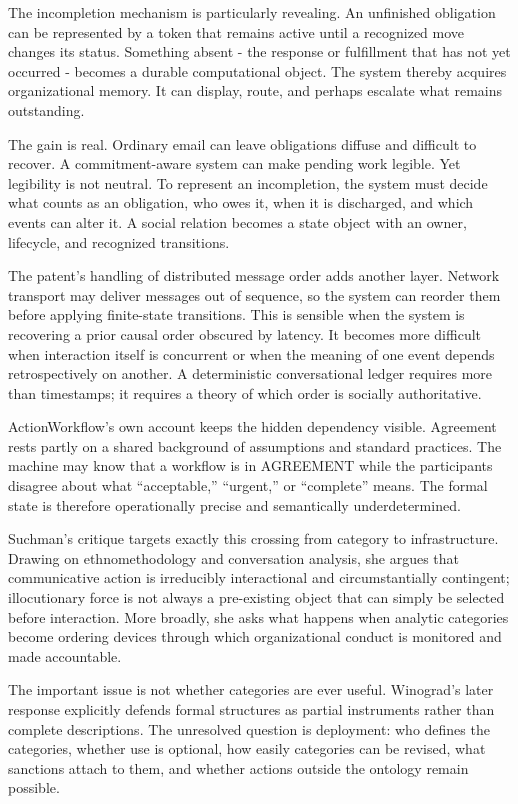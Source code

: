\documentclass[11pt]{article}
\begin{document}
The incompletion mechanism is particularly revealing. An unfinished obligation can be represented by a token that remains active until a recognized move changes its status. Something absent - the response or fulfillment that has not yet occurred - becomes a durable computational object. The system thereby acquires organizational memory. It can display, route, and perhaps escalate what remains outstanding. \cite{flores1993conversation}

The gain is real. Ordinary email can leave obligations diffuse and difficult to recover. A commitment-aware system can make pending work legible. Yet legibility is not neutral. To represent an incompletion, the system must decide what counts as an obligation, who owes it, when it is discharged, and which events can alter it. A social relation becomes a state object with an owner, lifecycle, and recognized transitions.

The patent's handling of distributed message order adds another layer. Network transport may deliver messages out of sequence, so the system can reorder them before applying finite-state transitions. This is sensible when the system is recovering a prior causal order obscured by latency. It becomes more difficult when interaction itself is concurrent or when the meaning of one event depends retrospectively on another. A deterministic conversational ledger requires more than timestamps; it requires a theory of which order is socially authoritative.

ActionWorkflow's own account keeps the hidden dependency visible. Agreement rests partly on a shared background of assumptions and standard practices. The machine may know that a workflow is in AGREEMENT while the participants disagree about what ``acceptable,'' ``urgent,'' or ``complete'' means. The formal state is therefore operationally precise and semantically underdetermined. \cite{medinamora1992actionworkflow}

Suchman's critique targets exactly this crossing from category to infrastructure. Drawing on ethnomethodology and conversation analysis, she argues that communicative action is irreducibly interactional and circumstantially contingent; illocutionary force is not always a pre-existing object that can simply be selected before interaction. More broadly, she asks what happens when analytic categories become ordering devices through which organizational conduct is monitored and made accountable. \cite{suchman1993categories}

The important issue is not whether categories are ever useful. Winograd's later response explicitly defends formal structures as partial instruments rather than complete descriptions. The unresolved question is deployment: who defines the categories, whether use is optional, how easily categories can be revised, what sanctions attach to them, and whether actions outside the ontology remain possible. \cite{winograd1994categories,suchman1995speech}
\end{document}
